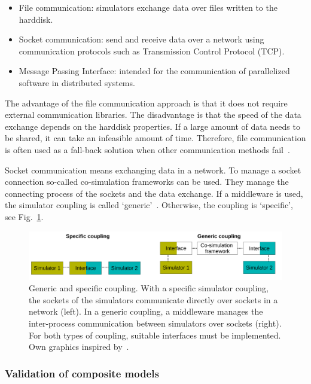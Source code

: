 \begin{itemize}
\item File communication: simulators exchange data over files written to the harddisk. 
\item Socket communication: send and receive data over a network using communication protocols such as Transmission Control Protocol (TCP).
\item Message Passing Interface: intended for the communication of parallelized software in distributed systems.
\end{itemize}

The advantage of the file communication approach is that it does not require external communication libraries. The disadvantage is that the speed of the data exchange depends on the harddisk properties. If a large amount of data needs to be shared, it can take an infeasible amount of time. Therefore, file communication is often used as a fall-back solution when other communication methods fail~\cite[p.153]{gatzhammer-2014-cs}. 

Socket communication means exchanging data in a network. To manage a socket connection so-called co-simulation frameworks can be used. They manage the connecting process of the sockets and the data exchange. If a middleware is used, the simulator coupling is called `generic'~\cite{steinbrink-2017-cs}. Otherwise, the coupling is `specific', see Fig.~\ref{fig:cosimulationcoupling}. 


\begin{figure}[hbt!]
\centering
\includegraphics[width=\textwidth]{../figures/state-of-the-art/coupling/genericspecic.pdf} 
\caption[Overview on co-simulation.]{Generic and specific coupling. With a specific simulator coupling, the sockets of the simulators communicate directly over sockets in a network (left). In a generic coupling, a middleware manages the inter-process communication between simulators over sockets (right). For both types of coupling, suitable interfaces must be implemented. Own graphics inspired by~\cite{steinbrink-2017-cs}.}
\label{fig:cosimulationcoupling}
\end{figure}


\subsubsection{Validation of composite models}

